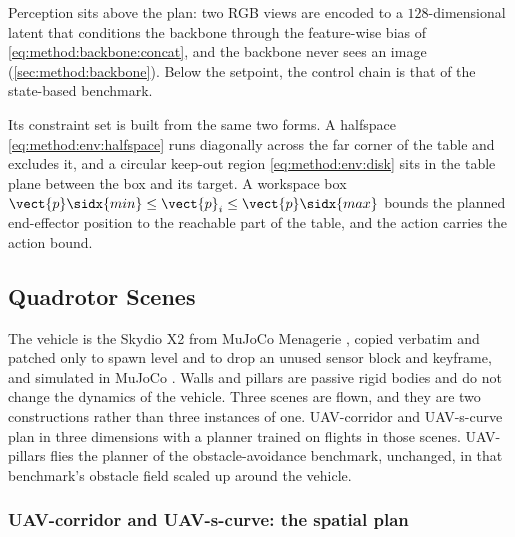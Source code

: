 Perception sits above the plan: two RGB views are encoded to a $128$-dimensional latent that
conditions the backbone through the feature-wise bias of \eqref{eq:method:backbone:concat}, and the
backbone never sees an image (\autoref{sec:method:backbone}). Below the setpoint, the control chain is
that of the state-based benchmark.

Its constraint set is built from the same two forms. A halfspace
\eqref{eq:method:env:halfspace} runs diagonally across the far corner of the table and excludes it,
and a circular keep-out region \eqref{eq:method:env:disk} sits in the table plane between the box
and its target. A workspace box $\vect{p}\sidx{min}\le\vect{p}_{i}\le\vect{p}\sidx{max}$ bounds the
planned end-effector position to the reachable part of the table, and the action carries the action
bound.

\subsection{Quadrotor Scenes}\label{sec:method:env:uav}

The vehicle is the Skydio X2 from MuJoCo Menagerie \parencite{zakka2022menagerie}, copied verbatim and
patched only to spawn level and to drop an unused sensor block and keyframe, and simulated in MuJoCo
\parencite{todorov2012mujoco}. Walls and pillars are passive rigid bodies and do not change the dynamics
of the vehicle. Three scenes are flown, and they are two constructions rather than three instances of
one. UAV-corridor and UAV-s-curve plan in three dimensions with a planner trained on flights in those
scenes. UAV-pillars flies the planner of the obstacle-avoidance benchmark, unchanged, in that
benchmark's obstacle field scaled up around the vehicle.

\subsubsection*{UAV-corridor and UAV-s-curve: the spatial plan}


